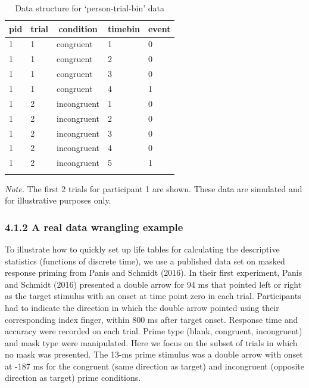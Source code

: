 \documentclass[
  man,floatsintext]{apa6}
\begin{document}
\begin{table}[H]

\begin{center}
\begin{threeparttable}

\caption{\label{tab:ha-data-table}Data structure for `person-trial-bin' data}

\begin{tabular}{lllll}
\toprule
pid & \multicolumn{1}{c}{trial} & \multicolumn{1}{c}{condition} & \multicolumn{1}{c}{timebin} & \multicolumn{1}{c}{event}\\
\midrule
1 & 1 & congruent & 1 & 0\\
1 & 1 & congruent & 2 & 0\\
1 & 1 & congruent & 3 & 0\\
1 & 1 & congruent & 4 & 1\\
1 & 2 & incongruent & 1 & 0\\
1 & 2 & incongruent & 2 & 0\\
1 & 2 & incongruent & 3 & 0\\
1 & 2 & incongruent & 4 & 0\\
1 & 2 & incongruent & 5 & 1\\
\bottomrule
\addlinespace
\end{tabular}

\begin{tablenotes}[para]
\normalsize{\textit{Note.} The first 2 trials for participant 1 are shown. These data are simulated and for illustrative purposes only.}
\end{tablenotes}

\end{threeparttable}
\end{center}

\end{table}

\subsubsection{4.1.2 A real data wrangling example}\label{a-real-data-wrangling-example}

To illustrate how to quickly set up life tables for calculating the descriptive statistics (functions of discrete time), we use a published data set on masked response priming from Panis and Schmidt (2016).
In their first experiment, Panis and Schmidt (2016) presented a double arrow for 94 ms that pointed left or right as the target stimulus with an onset at time point zero in each trial. Participants had to indicate the direction in which the double arrow pointed using their corresponding index finger, within 800 ms after target onset. Response time and accuracy were recorded on each trial. Prime type (blank, congruent, incongruent) and mask type were manipulated. Here we focus on the subset of trials in which no mask was presented. The 13-ms prime stimulus was a double arrow with onset at -187 ms for the congruent (same direction as target) and incongruent (opposite direction as target) prime conditions.
\end{document}
